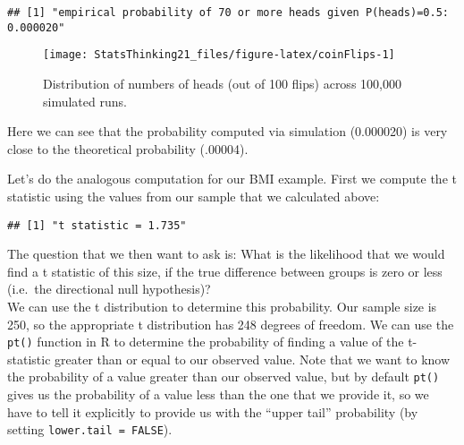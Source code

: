 \documentclass[]{book}
\newenvironment{Shaded}{\begin{snugshade}}{\end{snugshade}}
\newcommand{\KeywordTok}[1]{\textcolor[rgb]{0.13,0.29,0.53}{\textbf{#1}}}
\newcommand{\DataTypeTok}[1]{\textcolor[rgb]{0.13,0.29,0.53}{#1}}
\newcommand{\DecValTok}[1]{\textcolor[rgb]{0.00,0.00,0.81}{#1}}
\newcommand{\StringTok}[1]{\textcolor[rgb]{0.31,0.60,0.02}{#1}}
\newcommand{\OtherTok}[1]{\textcolor[rgb]{0.56,0.35,0.01}{#1}}
\newcommand{\OperatorTok}[1]{\textcolor[rgb]{0.81,0.36,0.00}{\textbf{#1}}}
\newcommand{\NormalTok}[1]{#1}
\theoremstyle{definition}
\theoremstyle{definition}
\theoremstyle{definition}
\theoremstyle{remark}
\begin{document}
\begin{verbatim}
## [1] "empirical probability of 70 or more heads given P(heads)=0.5: 0.000020"
\end{verbatim}

\begin{figure}
\texttt{[image: StatsThinking21\_files/figure-latex/coinFlips-1]} \caption{Distribution of numbers of heads (out of 100 flips) across 100,000 simulated runs.}\label{fig:coinFlips}
\end{figure}

Here we can see that the probability computed via simulation (0.000020)
is very close to the theoretical probability (.00004).

Let's do the analogous computation for our BMI example. First we compute
the t statistic using the values from our sample that we calculated
above:

\begin{Shaded}
\end{Shaded}

\begin{verbatim}
## [1] "t statistic = 1.735"
\end{verbatim}

The question that we then want to ask is: What is the likelihood that we
would find a t statistic of this size, if the true difference between
groups is zero or less (i.e.~the directional null hypothesis)?\\
We can use the t distribution to determine this probability. Our sample
size is 250, so the appropriate t distribution has 248 degrees of
freedom. We can use the \texttt{pt()} function in R to determine the
probability of finding a value of the t-statistic greater than or equal
to our observed value. Note that we want to know the probability of a
value greater than our observed value, but by default \texttt{pt()}
gives us the probability of a value less than the one that we provide
it, so we have to tell it explicitly to provide us with the ``upper
tail'' probability (by setting \texttt{lower.tail\ =\ FALSE}).

\begin{Shaded}
\end{Shaded}
\end{document}
